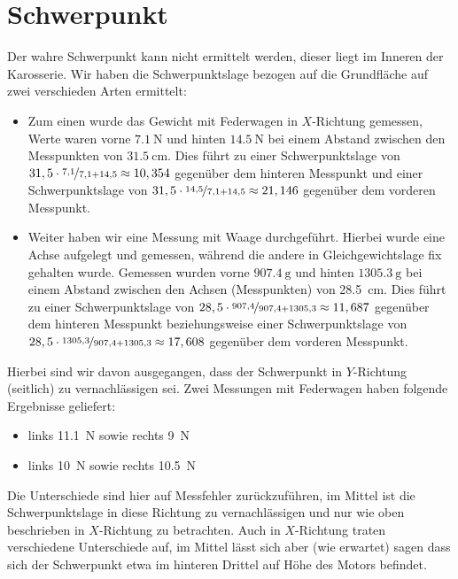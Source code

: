 \documentclass[10pt]{article}
\begin{document}
\section{Schwerpunkt}
    Der wahre Schwerpunkt kann nicht ermittelt werden, dieser liegt im Inneren der Karosserie.
    Wir haben die Schwerpunktslage bezogen auf die Grundfläche auf zwei verschieden Arten ermittelt:
    \begin{itemize}
    \item Zum einen wurde das Gewicht mit Federwagen in $X$-Richtung gemessen, Werte waren vorne $\SI{7,1}{\newton}$ und hinten $\SI{14,5}{\newton}$ bei einem Abstand zwischen den Messpunkten von $\SI{31,5}{\cm}$. Dies führt zu einer Schwerpunktslage von $31,5 \cdot \nicefrac{7,1}{7,1+14,5} \approx 10,354$ gegenüber dem hinteren Messpunkt und einer Schwerpunktslage von $31,5 \cdot \nicefrac{14,5}{7,1+14,5} \approx 21,146$ gegenüber dem vorderen Messpunkt.
    \item Weiter haben wir eine Messung mit Waage durchgeführt. Hierbei wurde eine Achse aufgelegt und gemessen, während die andere in Gleichgewichtslage fix gehalten wurde. Gemessen wurden vorne $\SI{907,4}{\gram}$ und hinten $\SI{1305,3}{\gram}$ bei einem Abstand zwischen den Achsen (Messpunkten) von \SI{28,5}{\cm}. Dies führt zu einer Schwerpunktslage von $28,5\cdot\nicefrac{907,4}{907,4+1305,3} \approx 11,687$ gegenüber dem hinteren Messpunkt beziehungsweise einer Schwerpunktslage von $28,5\cdot\nicefrac{1305,3}{907,4+1305,3} \approx 17,608$ gegenüber dem vorderen Messpunkt.
    \end{itemize}

    Hierbei sind wir davon ausgegangen, dass der Schwerpunkt in $Y$-Richtung (seitlich) zu vernachlässigen sei. Zwei Messungen mit Federwagen haben folgende Ergebnisse geliefert:
    \begin{itemize}
        \item links \SI{11,1}{\newton} sowie rechts \SI{9}{\newton}
        \item links \SI{10}{\newton} sowie rechts \SI{10,5}{\newton}
    \end{itemize}

    Die Unterschiede sind hier auf Messfehler zurückzuführen, im Mittel ist die Schwerpunktslage in diese Richtung zu vernachlässigen und nur wie oben beschrieben in $X$-Richtung zu betrachten.
    Auch in $X$-Richtung traten verschiedene Unterschiede auf, im Mittel lässt sich aber (wie erwartet) sagen dass sich der Schwerpunkt etwa im hinteren Drittel auf Höhe des Motors befindet.
\end{document}
